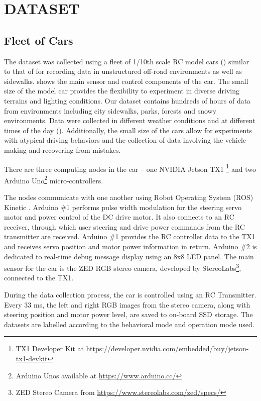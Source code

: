 \section{DATASET}
\label{sec:dataset}

\subsection{Fleet of Cars}
The dataset was collected using a fleet of 1/10th scale RC model cars () similar to that of \cite{intel_paper, williams2017information, giusti2016machine, muller2006off, muller2013real, krasheninnikov2017autonomous} for recording data in unstructured off-road environments as well as sidewalks.  shows the main sensor and control components of the car. The small size of the model car provides the flexibility to experiment in diverse driving terrains and lighting conditions. Our dataset contains hundreds of hours of data from environments including city sidewalks, parks, forests and snowy environments. Data were collected in different weather conditions and at different times of the day (). Additionally, the small size of the cars allow for experiments with atypical driving behaviors and the collection of data involving the vehicle making and recovering from mistakes.

There are three computing nodes in the car -- one NVIDIA Jetson TX1 \footnote{ TX1 Developer Kit at \url{https://developer.nvidia.com/embedded/buy/jetson-tx1-devkit}} and two Arduino Uno\footnote{Arduino Unos available at \url{https://www.arduino.cc/}} micro-controllers.

The nodes communicate with one another using Robot Operating System (ROS) Kinetic \cite{quigley2009ros}. Arduino \#1 performs pulse width modulation for the steering servo motor and power control of the DC drive motor. It also connects to an RC receiver, through which user steering and drive power commands from the RC transmitter are received. Arduino \#1 provides the RC controller data to the TX1 and receives servo position and motor power information in return.  Arduino \#2 is dedicated to real-time debug message display using an 8x8 LED panel. The main sensor for the car is the ZED RGB stereo camera, developed by StereoLabs\footnote{ ZED Stereo Camera from \url{https://www.stereolabs.com/zed/specs/}}, connected to the TX1.

During the data collection process, the car is controlled using an RC Transmitter. Every 33 ms, the left and right RGB images from the stereo camera, along with steering position and motor power level, are saved to on-board SSD storage. The datasets are labelled according to the behavioral mode and operation mode used.

